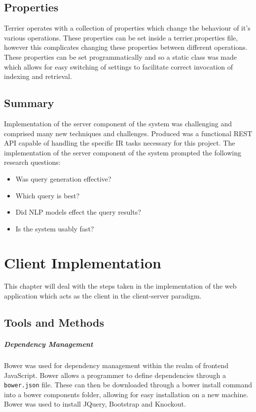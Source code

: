 \documentclass{l4proj}
\newcommand{\code}[1]{\texttt{#1}}
\begin{document}
\section{Properties}
Terrier operates with a collection of properties which change the behaviour of it's various operations. These properties can be set inside a terrier.properties file, however this complicates changing these properties between different operations. These properties can be set programmatically and so a static class was made which allows for easy switching of settings to facilitate correct invocation of indexing and retrieval.

\section{Summary} \label{serversummary}
Implementation of the server component of the system was challenging and comprised many new techniques and challenges. Produced was a functional REST API capable of handling the specific IR tasks necessary for this project.
The implementation of the server component of the system prompted the following research questions:
\begin{itemize}
\item Was query generation effective?
\item Which query is best?
\item Did NLP models effect the query results?
\item Is the system usably fast?
\end{itemize}

\chapter{Client Implementation} \label{clientimplementation}
This chapter will deal with the steps taken in the implementation of the web application which acts as the client in the client-server paradigm.

\section{Tools and Methods}
\paragraph{Dependency Management}
Bower was used for dependency management within the realm of frontend JavaScript. Bower allows a programmer to define dependencies through a \code{bower.json} file. These can then be downloaded through a bower install command into a bower components folder, allowing for easy installation on a new machine. Bower was used to install JQuery, Bootstrap and Knockout.
\end{document}
